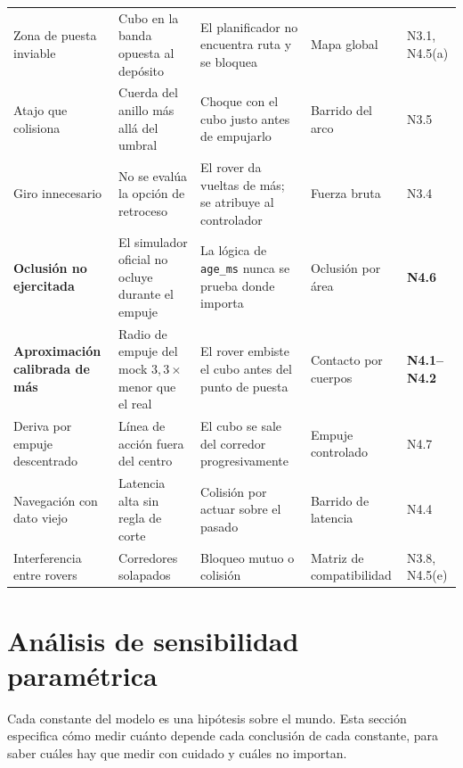 \documentclass[11pt,a4paper]{article}
\begin{document}
\begin{longtable}{p{2.4cm}p{4.1cm}p{4.3cm}p{2.0cm}p{1.5cm}}
\addlinespace
Zona de puesta inviable & Cubo en la banda opuesta al depósito &
El planificador no encuentra ruta y se bloquea & Mapa global & N3.1, N4.5(a) \\
\addlinespace
Atajo que colisiona & Cuerda del anillo más allá del umbral &
Choque con el cubo justo antes de empujarlo & Barrido del arco & N3.5 \\
\addlinespace
Giro innecesario & No se evalúa la opción de retroceso &
El rover da vueltas de más; se atribuye al controlador & Fuerza bruta & N3.4 \\
\addlinespace
\textbf{Oclusión no ejercitada} & El simulador oficial no ocluye durante el empuje &
La lógica de \texttt{age\_ms} nunca se prueba donde importa &
Oclusión por área & \textbf{N4.6} \\
\addlinespace
\textbf{Aproximación calibrada de más} & Radio de empuje del mock $3{,}3\times$ menor
que el real & El rover embiste el cubo antes del punto de puesta &
Contacto por cuerpos & \textbf{N4.1--N4.2} \\
\addlinespace
Deriva por empuje descentrado & Línea de acción fuera del centro &
El cubo se sale del corredor progresivamente & Empuje controlado & N4.7 \\
\addlinespace
Navegación con dato viejo & Latencia alta sin regla de corte &
Colisión por actuar sobre el pasado & Barrido de latencia & N4.4 \\
\addlinespace
Interferencia entre rovers & Corredores solapados &
Bloqueo mutuo o colisión & Matriz de compatibilidad & N3.8, N4.5(e) \\
\end{longtable}

\section{Análisis de sensibilidad paramétrica}

Cada constante del modelo es una hipótesis sobre el mundo. Esta sección especifica cómo
medir cuánto depende cada conclusión de cada constante, para saber cuáles hay que medir
con cuidado y cuáles no importan.
\end{document}
